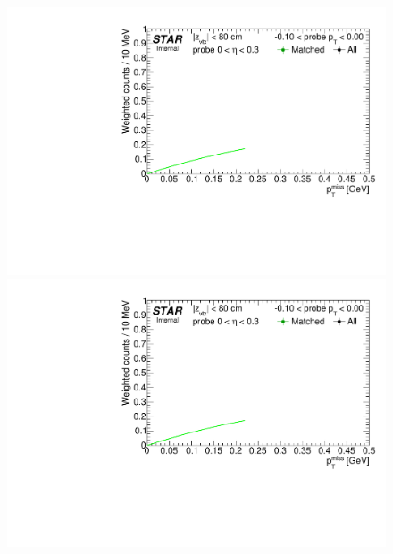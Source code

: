 \begin{figure}[h!]
{  \includegraphics[width=\linewidth,page=9]{graphics/correctionsToEff/TOF_tagAndProbe/Fitting_effVsPt_data_ETABINS_B.CPT2.pdf}\\
  \includegraphics[width=\linewidth,page=11]{graphics/correctionsToEff/TOF_tagAndProbe/Fitting_effVsPt_data_ETABINS_B.CPT2.pdf}

}
\end{figure}
